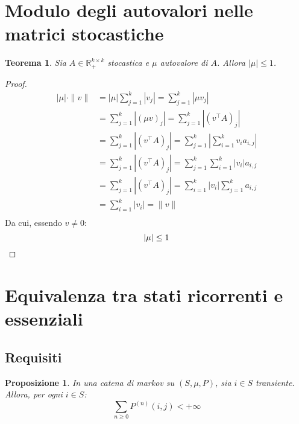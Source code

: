 \documentclass{article}
\theoremstyle{plain}
\newtheorem{thm}{Teorema}
\newtheorem{prop}{Proposizione}
\newcommand{\R}{\mathbb R}
\newcommand{\Rp}{\R_+}
\newcommand{\abs}[1]{\left|#1\right|}
\newcommand{\norm}[1]{\|#1\|}
\newcommand{\tra}{^\top}
\newcommand{\ape}[1]{^{(#1)}}
\begin{document}
\section{Modulo degli autovalori nelle matrici stocastiche}

\begin{thm}
	Sia $A\in\Rp^{k\times k}$ stocastica e $\mu$ autovalore di $A$. Allora $\abs{\mu}\le 1$.
\end{thm}
\begin{proof}
	\begin{align*}
		\abs{\mu}\cdot\norm{v} & = \abs{\mu}\sum_{j=1}^k\abs{v_j} = \sum_{j=1}^k\abs {\mu v_j}                  \\
		                       & = \sum_{j=1}^k\abs {(\mu v)_j} = \sum_{j=1}^k\abs {(v\tra A)_j}                \\
		                       & = \sum_{j=1}^k\abs {(v\tra A)_j} = \sum_{j=1}^k\abs {\sum_{i=1}^k v_i a_{i,j}} \\
		                       & = \sum_{j=1}^k\abs {(v\tra A)_j} = \sum_{j=1}^k \sum_{i=1}^k \abs{v_i} a_{i,j} \\
		                       & = \sum_{j=1}^k\abs {(v\tra A)_j} = \sum_{i=1}^k \abs{v_i} \sum_{j=1}^k a_{i,j} \\
		                       & = \sum_{i=1}^k \abs{v_i} = \norm{v}                                            \\
	\end{align*}
	Da cui, essendo $v\neq 0$:
	\begin{equation*}
		\abs{\mu}\leq 1 \qedhere
	\end{equation*}
\end{proof}




\section{Equivalenza tra stati ricorrenti e essenziali}


\subsection{Requisiti}
\begin{prop}\label{prop:sumtrans}
	In una catena di markov su $(S,\mu,P)$, sia $i\in S$ transiente. Allora, per ogni $i\in S$:
	\begin{equation*}
		\sum_{n\ge0}P\ape{n}(i,j)<+\infty
	\end{equation*}
\end{prop}
\end{document}
